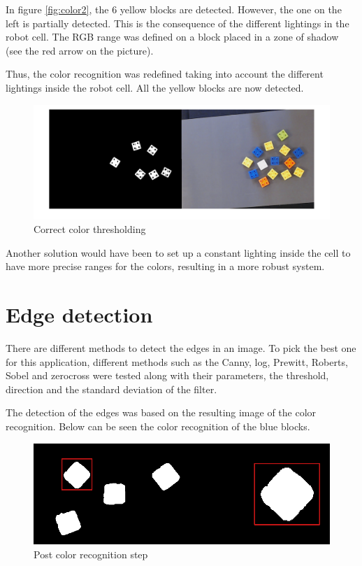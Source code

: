 In figure \ref{fig:color2}, the 6 yellow blocks are detected. However, the one on the left is partially detected. This is the consequence of the different lightings in the robot cell. The RGB range was defined on a block placed in a zone of shadow (see the red arrow on the picture). \par


Thus, the color recognition was redefined taking into account the different lightings inside the robot cell. All the yellow blocks are now detected.



\begin{figure}[H]
  \centering
  \includegraphics[scale=0.3]{figures/Thres_Y_good.png}
  \caption[LABEL] {Correct color thresholding}
\end{figure}

Another solution would have been to set up a constant lighting inside the cell to have more precise ranges for the colors, resulting in a more robust system.



 \section{Edge detection}

	There are different methods to detect the edges in an image. To pick the best one for this application, different methods such as the Canny, log, Prewitt, Roberts, Sobel and zerocross were tested along with their parameters, the threshold, direction and the standard deviation of the filter. \par


	The detection of the edges was based on the resulting image of the color recognition. Below can be seen the color recognition of the blue blocks.

\begin{figure}[H]
  \centering
  \includegraphics[scale=0.3]{figures/color_rec_zoom.png}
  \caption[LABEL] {Post color recognition step}
\end{figure}	
	


